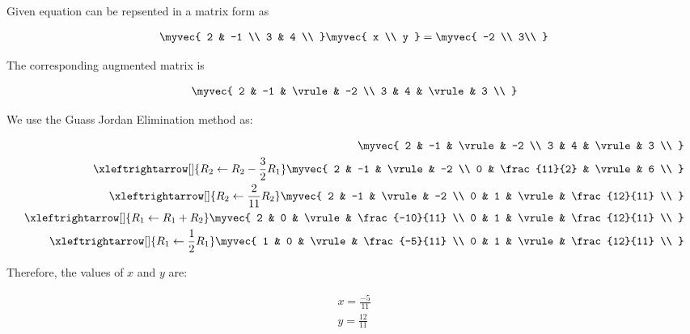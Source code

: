 	
	

Given equation can be repsented in a matrix form as

\begin{align}
	\myvec{
		2 & -1 \\
		3 & 4 \\ 
	}
	\myvec{
		x \\ y 
	}
	=
	\myvec{
		-2 \\ 3\\
	}
\end{align}

The corresponding augmented matrix is 

\begin{align}
		\myvec{
		2 & -1 & \vrule & -2 \\
		3 & 4 & \vrule & 3 \\
	}
\end{align}

We use the Guass Jordan Elimination method as:

\begin{align}
	\myvec{
		2 & -1 & \vrule & -2 \\
		3 & 4 & \vrule & 3 \\
	}
	\\
	\xleftrightarrow[]{R_2 \leftarrow R_2 - \frac{3}{2}R_1}
	\myvec{
		2 & -1 & \vrule & -2 \\
		0 & \frac{11}{2} & \vrule & 6 \\
	}
	\\
	\xleftrightarrow[]{R_2\leftarrow \frac{2}{11}R_2}
	\myvec{
		2 & -1 & \vrule & -2 \\
		0 & 1 & \vrule & \frac{12}{11} \\
	}
	\\
	\xleftrightarrow[]{R_1 \leftarrow R_1 + R_2}
	\myvec{
		2 & 0 & \vrule & \frac{-10}{11} \\
		0 & 1 & \vrule & \frac{12}{11} \\
	}
	\\
	\xleftrightarrow[]{R_1 \leftarrow \frac{1}{2}R_1}
	\myvec{
		1 & 0 & \vrule & \frac{-5}{11} \\
		0 & 1 & \vrule & \frac{12}{11} \\
	}
\end{align}

Therefore, the values of $x$ and $y$ are:

\begin{align}
	x = \frac{-5}{11} \\
	y = \frac{12}{11}
\end{align}


    
